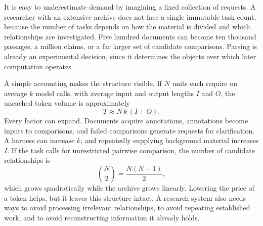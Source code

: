 \documentclass[11pt]{article}
\theoremstyle{remark}
\begin{document}
It is easy to underestimate demand by imagining a fixed collection of requests. A researcher with an extensive archive does not face a single immutable task count, because the number of tasks depends on how the material is divided and which relationships are investigated. Five hundred documents can become ten thousand passages, a million claims, or a far larger set of candidate comparisons. Parsing is already an experimental decision, since it determines the objects over which later computation operates.

A simple accounting makes the structure visible. If $N$ units each require on average $k$ model calls, with average input and output lengths $I$ and $O$, the uncached token volume is approximately
\begin{equation}
T \approx N\,k\,(I+O).
\end{equation}
Every factor can expand. Documents acquire annotations, annotations become inputs to comparisons, and failed comparisons generate requests for clarification. A harness can increase $k$, and repeatedly supplying background material increases $I$. If the task calls for unrestricted pairwise comparison, the number of candidate relationships is
\begin{equation}
\binom{N}{2} = \frac{N(N-1)}{2},
\end{equation}
which grows quadratically while the archive grows linearly. Lowering the price of a token helps, but it leaves this structure intact. A research system also needs ways to avoid processing irrelevant relationships, to avoid repeating established work, and to avoid reconstructing information it already holds.
\end{document}
